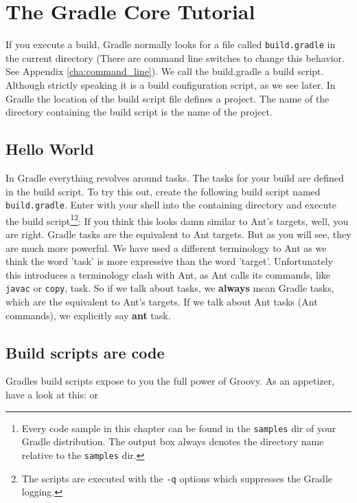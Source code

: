 \chapter{The Gradle Core Tutorial}
\label{cha:gradle_core_tutorial}
If you execute a build, Gradle normally looks for a file called \texttt{build.gradle} in the current directory (There are command line switches to change this behavior. See Appendix \ref{cha:command_line}). We call the build.gradle a build script. Although strictly speaking it is a build configuration script, as we see later. In Gradle the location of the build script file defines a project. The name of the directory containing the build script is the name of the project.  

\section{Hello World}
In Gradle everything revolves around tasks. The tasks for your build are defined in the build script. To try this out, create the following build script named \texttt{build.gradle}.
Enter with your shell into the containing directory and execute the build script\footnote{Every code sample in this chapter can be found in the \texttt{samples} dir of your Gradle distribution. The output box always denotes the directory name relative to the \texttt{samples} dir.}\footnote{The scripts are executed with the \texttt{-q} options which suppresses the Gradle logging.}:
If you think this looks damn similar to Ant's targets, well, you are right. Gradle tasks are the equivalent to Ant targets. But as you will see, they are much more powerful. We have used a different terminology to Ant as we think the word 'task' is more expressive than the word 'target'. Unfortunately this introduces a terminology clash with Ant, as Ant calls its commands, like \texttt{javac} or \texttt{copy}, task. So if we talk about tasks, we \textbf{always} mean Gradle tasks, which are the equivalent to Ant's targets. If we talk about Ant tasks (Ant commands), we explicitly say \textbf{ant} task.

\section{Build scripts are code}
Gradles build scripts expose to you the full power of Groovy. As an appetizer, have a look at this:
or

